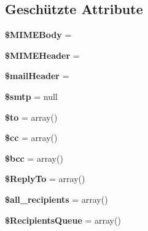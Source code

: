 \subsection*{Geschützte Attribute}
\begin{DoxyCompactItemize}
\item 
\mbox{\label{class_p_h_p_mailer_a402d38834379651e52ddaf239cdce6e6}} 
{\bfseries \$\+M\+I\+M\+E\+Body} = \textquotesingle{}\textquotesingle{}
\item 
\mbox{\label{class_p_h_p_mailer_a9ee27a94a8595267eb8544fb18ad6672}} 
{\bfseries \$\+M\+I\+M\+E\+Header} = \textquotesingle{}\textquotesingle{}
\item 
\mbox{\label{class_p_h_p_mailer_a3a839f49603d36ba4e3ee786ac7039dc}} 
{\bfseries \$mail\+Header} = \textquotesingle{}\textquotesingle{}
\item 
\mbox{\label{class_p_h_p_mailer_a785ebe388dfcd1a76d445df09b6be3d6}} 
{\bfseries \$smtp} = null
\item 
\mbox{\label{class_p_h_p_mailer_afa095cad0712f480475cea3a1b9a498e}} 
{\bfseries \$to} = array()
\item 
\mbox{\label{class_p_h_p_mailer_aab84d69e0d9f30d16c7c895f40c02383}} 
{\bfseries \$cc} = array()
\item 
\mbox{\label{class_p_h_p_mailer_a47faeb7fa77389aeec99d8dbeb1be106}} 
{\bfseries \$bcc} = array()
\item 
\mbox{\label{class_p_h_p_mailer_aff7bfc1ad6c3e1e95d0caa6ecf7bfc25}} 
{\bfseries \$\+Reply\+To} = array()
\item 
\mbox{\label{class_p_h_p_mailer_a6300d0a50c65a033269ff56f8bba844f}} 
{\bfseries \$all\+\_\+recipients} = array()
\item 
\mbox{\label{class_p_h_p_mailer_afcc21cd5fd378568160ab3cbcbcc5916}} 
{\bfseries \$\+Recipients\+Queue} = array()
\item 
\mbox{\label{class_p_h_p_mailer_ae68f5dc85bb5dba0fee95dc8421a2df4}} 

\end{DoxyCompactItemize}
